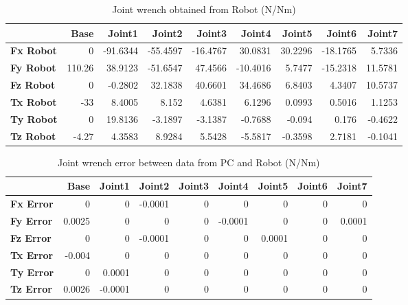 \begin{table}[h!]
	\centering
	\caption{Joint wrench obtained from Robot (N/Nm)}
	\label{wrech_Robot_Pose3}
	\begin{tabular}{|l|r|r|r|r|r|r|r|r|}
		\hline
		\textbf{} & \textbf{Base} & \textbf{Joint1}  & \textbf{Joint2}  & \textbf{Joint3}  & \textbf{Joint4}  & \textbf{Joint5}  & \textbf{Joint6}  & \textbf{Joint7} \\ \hline
		\textbf{Fx Robot}  & 0        & -91.6344        & -55.4597        & -16.4767        & 30.0831        & 30.2296        & -18.1765        & 5.7336 \\ \hline
		\textbf{Fy Robot}  & 110.26        & 38.9123        & -51.6547        & 47.4566        & -10.4016        & 5.7477        & -15.2318        & 11.5781 \\ \hline
		\textbf{Fz Robot}  & 0        & -0.2802        & 32.1838        & 40.6601        & 34.4686        & 6.8403        & 4.3407        & 10.5737 \\ \hline
		\textbf{Tx Robot}  & -33        & 8.4005        & 8.152        & 4.6381        & 6.1296        & 0.0993        & 0.5016        & 1.1253 \\ \hline
		\textbf{Ty Robot}  & 0        & 19.8136        & -3.1897        & -3.1387        & -0.7688        & -0.094        & 0.176        & -0.4622 \\ \hline
		\textbf{Tz Robot}  & -4.27        & 4.3583        & 8.9284        & 5.5428        & -5.5817        & -0.3598        & 2.7181        & -0.1041 \\ \hline
	\end{tabular}
\end{table}

\begin{table}[h!]
	\centering
	\caption{Joint wrench error between data from PC and Robot (N/Nm)}
	\label{wrech_Error_Pose3}
	\begin{tabular}{|l|r|r|r|r|r|r|r|r|}
		\hline
		\textbf{}  & \textbf{Base} & \textbf{Joint1}  & \textbf{Joint2}  & \textbf{Joint3}  & \textbf{Joint4}  & \textbf{Joint5}  & \textbf{Joint6}  & \textbf{Joint7} \\ \hline
		\textbf{Fx Error}  & 0        & 0        & -0.0001        & 0        & 0        & 0        & 0        & 0 \\ \hline
		\textbf{Fy Error}  & 0.0025        & 0        & 0        & 0        & -0.0001        & 0        & 0        & 0.0001 \\ \hline
		\textbf{Fz Error}  & 0        & 0        & -0.0001        & 0        & 0        & 0.0001        & 0        & 0 \\ \hline
		\textbf{Tx Error}  & -0.004        & 0        & 0        & 0        & 0        & 0        & 0        & 0 \\ \hline
		\textbf{Ty Error}  & 0        & 0.0001        & 0        & 0        & 0        & 0        & 0        & 0 \\ \hline
		\textbf{Tz Error}  & 0.0026        & -0.0001        & 0        & 0        & 0        & 0        & 0        & 0 \\ \hline
	\end{tabular}
\end{table}

